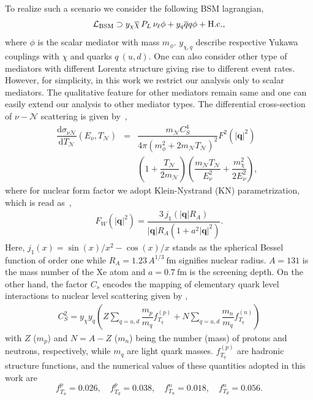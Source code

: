 \documentclass[prd,10pt,twocolumn,nofootinbib,preprint,superscriptaddress]{revtex4}
\def\d{\mathrm{d}}
\newcommand{\nuc}{\mathcal{N}}
\newcommand{\qt}{\left|\mathbf{q}\right|}
\begin{document}
To realize such a scenario we consider the following BSM lagrangian,
\begin{equation}
\label{eq:effective-lagrangian}
     \mathcal{L}_{\rm BSM} \supset y_\chi \overline{\chi}\, P_L \,\nu_\ell \phi + y_q\overline{q}q \phi + \mathrm{H.c.},
\end{equation}
where $\phi$ is the scalar mediator with mass $m_\phi$. $y_{\chi,q}$ describe respective Yukawa couplings with $\chi$ and quarks $q~(u,d)$.
One can also consider other type of mediators with different Lorentz structure giving rise to different event rates.
However, for simplicity, in this work we restrict our analysis only to scalar mediators. 
The qualitative feature for other mediators remain same and one can easily extend our analysis to other mediator types.
The differential cross-section of $\nu-\nuc$ scattering is given by~\cite{Candela:2024ljb},
\begin{eqnarray}
    \dfrac{\d \sigma_{\nu \mathcal{N}}}{\d T_\mathcal{N}} (E_\nu, T_\mathcal{N}) &=& \dfrac{m_\mathcal{N} C_S^4}{4\pi (m_\phi^2 + 2m_\mathcal{N} T_\mathcal{N})^2} F^2(\qt^2)  \nonumber\\&& 
     \left(1 + \dfrac{T_\mathcal{N}}{2 m_\mathcal{N}}\right) \left(\dfrac{m_\mathcal{N} T_\mathcal{N}}{E_\nu^2} + \dfrac{m_\chi^2}{2 E_\nu^2}\right),~~ \label{eq:cross-section-scalar-CEvNS}
\end{eqnarray}
where for nuclear form factor we adopt Klein-Nystrand (KN) parametrization, which is read as~\cite{Klein:1999qj},
\begin{eqnarray}
    F_W(\qt^2) =  \dfrac{3\, j_1(\qt R_A)}{\qt R_A (1 + a^2 \qt^2)} .\end{eqnarray}
Here, $j_1(x) = \sin(x)/x^2 - \cos(x)/x$ stands as the spherical Bessel function of order one while $R_A = 1.23 \,A^{1/3}~\mathrm{fm}$ signifies  nuclear radius. $A=131$ is the mass number of the Xe atom and $a = 0.7~\mathrm{fm}$ is the screening depth.
On the other hand,
the factor $C_s$ encodes the mapping of elementary quark level interactions to nuclear level scattering given by \cite{Candela:2024ljb},
\begin{eqnarray}
    C_S^2 = y_\chi y_q \left( Z \sum_{q = u, d} \dfrac{m_p}{m_q} f_{T_q}^{(p)} + N \sum_{q = u,d} \dfrac{m_n}{m_q} f_{T_q}^{(n)} \right)
\end{eqnarray}
with $Z$ ($m_p$) and $N = A - Z$ ($m_n$) being the number (mass) of protons and neutrons, respectively, while $m_q$ are light quark masses. $f_{T_q}^{(p)}$ are hadronic structure functions, and the numerical values of these quantities adopted in this work are~\cite{DelNobile:2021wmp}
%
\begin{equation}
f_{T_u}^{p}=0.026,\quad
f_{T_d}^{p}=0.038,\quad
f_{T_u}^{n}=0.018,\quad
f_{T_d}^{n}=0.056.
\end{equation}
\end{document}

